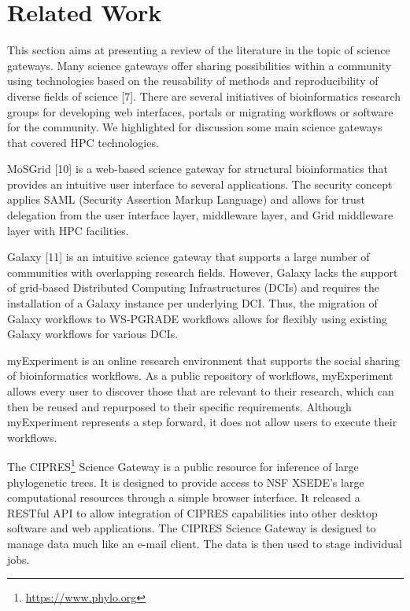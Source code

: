 \section{Related Work}

This section aims at presenting a review of the literature in the topic of science gateways. Many science gateways offer sharing possibilities within a community using technologies based on the reusability of methods and reproducibility of diverse fields of science [7]. There are several initiatives of bioinformatics research groups for developing web interfaces, portals or migrating workflows or software for the community. We highlighted for discussion some main science gateways that covered HPC technologies.

MoSGrid [10] is a web-based science gateway for structural bioinformatics that provides an intuitive user interface to several applications. The security concept applies SAML (Security Assertion Markup Language) and allows for trust delegation from the user interface layer, middleware layer, and Grid middleware layer with HPC facilities. 

Galaxy [11] is an intuitive science gateway that supports a large number of communities with overlapping research fields. However, Galaxy lacks the support of grid-based Distributed Computing Infrastructures (DCIs) and requires the installation of a Galaxy instance per underlying DCI. Thus, the migration of Galaxy workflows to WS-PGRADE workflows allows for flexibly using existing Galaxy workflows for various DCIs.

myExperiment \cite{10.1093/nar/gkq429} is an online research environment that supports the social sharing of bioinformatics workflows. As a public repository of workflows, myExperiment allows every user to discover those that are relevant to their research, which can then be reused and repurposed to their specific requirements. Although myExperiment represents a step forward, it does not allow users to execute their workflows.

The CIPRES\footnote{\url{https://www.phylo.org}} Science Gateway is a public resource for inference of large phylogenetic trees. It is designed to provide access to NSF XSEDE’s large computational resources through a simple browser interface. It released a RESTful API to allow integration of CIPRES capabilities into other desktop software and web applications. The CIPRES Science Gateway is designed to manage data much like an e-mail client. The data is then used to stage individual jobs.


